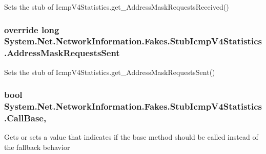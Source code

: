 Sets the stub of Icmp\-V4\-Statistics.\-get\-\_\-\-Address\-Mask\-Requests\-Received()

\hypertarget{class_system_1_1_net_1_1_network_information_1_1_fakes_1_1_stub_icmp_v4_statistics_aa94ccde3bcbe73019f10f5b42371bc3b}{
\subsubsection[{Address\-Mask\-Requests\-Sent}]{\setlength{\rightskip}{0pt plus 5cm}override long System.\-Net.\-Network\-Information.\-Fakes.\-Stub\-Icmp\-V4\-Statistics.\-Address\-Mask\-Requests\-Sent\hspace{0.3cm}{\ttfamily [get]}}}\label{class_system_1_1_net_1_1_network_information_1_1_fakes_1_1_stub_icmp_v4_statistics_aa94ccde3bcbe73019f10f5b42371bc3b}


Sets the stub of Icmp\-V4\-Statistics.\-get\-\_\-\-Address\-Mask\-Requests\-Sent()

\hypertarget{class_system_1_1_net_1_1_network_information_1_1_fakes_1_1_stub_icmp_v4_statistics_abe2552d2610fe22fbc4222ae749f662f}{
\subsubsection[{Call\-Base}]{\setlength{\rightskip}{0pt plus 5cm}bool System.\-Net.\-Network\-Information.\-Fakes.\-Stub\-Icmp\-V4\-Statistics.\-Call\-Base\hspace{0.3cm}{\ttfamily [get]}, {\ttfamily [set]}}}\label{class_system_1_1_net_1_1_network_information_1_1_fakes_1_1_stub_icmp_v4_statistics_abe2552d2610fe22fbc4222ae749f662f}


Gets or sets a value that indicates if the base method should be called instead of the fallback behavior

